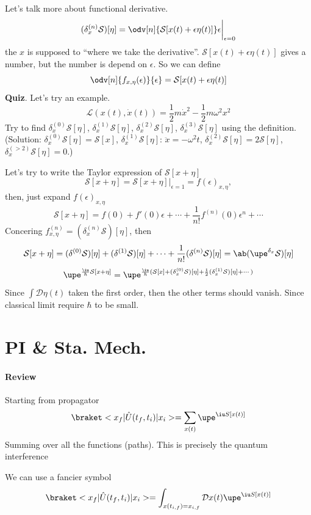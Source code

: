 Let's talk more about functional derivative.
\[
  (\delta^{(n)}_x\mathcal S)[\eta] = \odv[n]{\mathcal S[x(t) + \epsilon\eta(t)]}\epsilon\bigg|_{\epsilon=0}
\]
the $x$ is supposed to ``where we take the derivative''.
$\mathcal S[x(t) + \epsilon\eta(t)]$ gives a number, but the number is depend on $\epsilon$. So we can define
\[
  \odv[n]{f_{x,\eta}(\epsilon)}{\epsilon} = \mathcal S[x(t) + \epsilon\eta(t)]
\]
\textbf{Quiz}.
Let's try an example.
\[
  \mathcal L(x(t), \dot x(t)) = \frac12m\dot x^2 - \frac12 m\omega^2x^2
\]
Try to find $\delta_x^{(0)}\mathcal S[\eta]$,
$\delta_x^{(1)}\mathcal S[\eta]$,
$\delta_x^{(2)}\mathcal S[\eta]$,
$\delta_x^{(3)}\mathcal S[\eta]$
using the definition.
(Solution: $\delta_x^{(0)}\mathcal S[\eta] = \mathcal S[x]$,
$\delta_x^{(1)}\mathcal S[\eta]$: $\ddot x = -\omega^2t$, $\delta_x^{(2)}\mathcal S[\eta] = 2\mathcal S[\eta]$, $\delta_x^{(> 2)}\mathcal S[\eta] = 0$.)

Let's try to write the Taylor expression of $\mathcal S[x + \eta]$
\begin{equation}
  \mathcal S[x + \eta] = \mathcal S[x + \eta]\big|_{\epsilon = 1} = f(\epsilon)_{x,\eta},
\end{equation}
then, just expand $f(\epsilon)_{x,\eta}$
\[
  \mathcal S[x + \eta] = f(0) + f'(0)\epsilon + \cdots + \frac1{n!}f^{(n)}(0) \epsilon^n + \cdots
\]
Concering $f^{(n)}_{x,\eta} = (\delta_x^{(n)} \mathcal S)[\eta]$, then
\begin{equation}
  \mathcal S[x + \eta] = (\delta^{(0)}\mathcal S)[\eta] + (\delta^{(1)}\mathcal S)[\eta] + \cdots + \frac1{n!}(\delta^{(n)}\mathcal S)[\eta]
= \ab(\upe^{\delta_x}\mathcal S)[\eta]
\end{equation}
\begin{equation}
  \upe^{\frac\iu\hbar\mathcal S[x+\eta]} = \upe^{\frac\iu\hbar(\mathcal S[x] + (\delta_x^{(0)}\mathcal S)[\eta] + \frac12(\delta_x^{(1)}\mathcal S)[\eta] + \cdots)}
\end{equation}
Since $\int \mathcal D\eta(t)$ taken the first order, then the other terms should vanish.
Since classical limit require $\hbar$ to be small.

\section{PI \& Sta. Mech.}

\paragraph{Review}
Starting from propagator
\[
  \braket<x_f|\hat U(t_f, t_i)|x_i> = \sum_{x(t)} \upe^{\iu S[x(t)]}
\]
Summing over all the functions (paths).
This is precisely the quantum interference
\begin{center}
\end{center}
We can use a fancier symbol
\[
  \braket<x_f|\hat U(t_f, t_i)|x_i>
= \int_{x(t_{i,f}) = x_{i,f}} \mathcal D x(t) \upe^{\iu S[x(t)]}
\]
